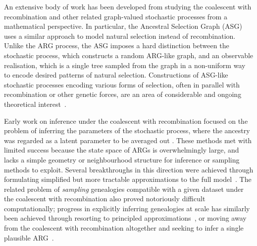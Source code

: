 \documentclass{article}
\begin{document}
An extensive body of work has been developed from
studying the coalescent with recombination
and other related
graph-valued stochastic processes from a mathematical perspective.
In particular, the Ancestral Selection Graph
(ASG)~\citep{krone1997ancestral,neuhauser1997genealogy}
uses a similar approach to model natural selection instead of recombination.
Unlike the ARG process, the ASG imposes a hard distinction between the stochastic process,
which constructs a random ARG-like graph, and an observable realisation,
which is a single tree sampled from the graph in a non-uniform way to encode
desired patterns of natural selection.
Constructions of ASG-like stochastic processes encoding various
forms of selection, often in parallel with recombination or other genetic forces,
are an area of considerable and ongoing theoretical interest~\citep[e.g.][]{
neuhauser1999ancestral,
donnelly1999genealogical,
fearnhead2001perfect,
fearnhead2003ancestral,
etheridge2009coalescent,
gonzalezcasanova2018duality,
koskela2019robust}.

Early work on inference under the coalescent with recombination
focused on the problem of
inferring the parameters of the
stochastic process, where the ancestry was regarded as a
latent parameter to be averaged out
\citep[e.g.][]{griffiths1996ancestral,kuhner2000maximum, nielsen2000estimation,
fearnhead2001estimating}.
These methods met with limited success
because the state space of ARGs is overwhelmingly large, and
lacks a simple geometry or neighbourhood structure for inference or
sampling methods to  exploit.
Several breakthroughs in this direction were achieved through
formulating simplified but more tractable approximations to the full
model~\citep{mcvean2005approximating,marjoram2006fast,li2011inference,
paul2011accurate,schiffels2014inferring}.
The related problem of \emph{sampling} genealogies compatible with a given
dataset under the coalescent with recombination also proved notoriously difficult
computationally; progress in explicitly inferring genealogies at scale
has similarly been achieved through resorting to principled
approximations~\citep{rasmussen2014genome,mahmoudi2022bayesian},
or moving away from the coalescent with recombination altogether and seeking
to infer a single plausible ARG~\citep[e.g.][]{
minichiello2006mapping,kelleher2019inferring,speidel2019method}.
\end{document}
